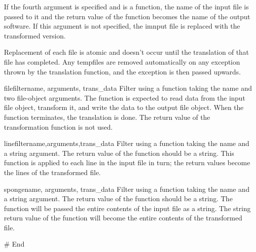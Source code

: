 If the fourth argument is specified and is a function, the name of the
input file is passed to it and the return value of the function
becomes the name of the output software.  If this argument is not
specified, the imnput file is replaced with the transformed version.

Replacement of each file is atomic and doesn't occur until the
translation of that file has completed.  Any tempfiles are removed
automatically on any exception thrown by the translation function,
and the exception is then passed upwards.

\begin{funcdesc}{filefilter}{name, arguments, trans_data}
Filter using a function taking the name and two file-object
arguments. The function is expected to read data from the input file
object, transform it, and write the data to the output file object.
When the function terminates, the translation is done.  The return
value of the transformation function is not used.
\end{funcdesc}

\begin{funcdesc}{linefilter}{name,arguments,trans_data}
Filter using a function taking the name and a string argument.  The return
value of the function should be a string.  This function is applied to
each line in the input file in turn; the return values become the
lines of the transformed file.
\end{funcdesc}

\begin{funcdesc}{sponge}{name, arguments, trans_data}
Filter using a function taking the name and a string argument.  The
return value of the function should be a string. The function will be
passed the entire contents of the input file as a string.  The string
return value of the function will become the entire contents of the
transformed file.
\end{funcdesc}

# End


